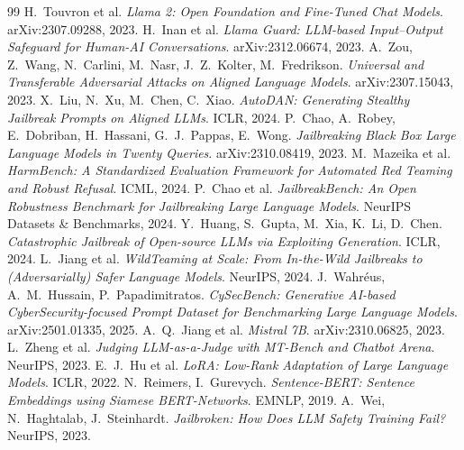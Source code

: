 \documentclass[11pt]{article}
\begin{document}

\begin{thebibliography}{99}
\small
{} H.\ Touvron et al. \emph{Llama 2: Open Foundation and Fine-Tuned Chat Models}. arXiv:2307.09288, 2023.
 H.\ Inan et al. \emph{Llama Guard: LLM-based Input--Output Safeguard for Human-AI Conversations}. arXiv:2312.06674, 2023.
 A.\ Zou, Z.\ Wang, N.\ Carlini, M.\ Nasr, J.\ Z.\ Kolter, M.\ Fredrikson. \emph{Universal and Transferable Adversarial Attacks on Aligned Language Models}. arXiv:2307.15043, 2023.
 X.\ Liu, N.\ Xu, M.\ Chen, C.\ Xiao. \emph{AutoDAN: Generating Stealthy Jailbreak Prompts on Aligned LLMs}. ICLR, 2024.
 P.\ Chao, A.\ Robey, E.\ Dobriban, H.\ Hassani, G.\ J.\ Pappas, E.\ Wong. \emph{Jailbreaking Black Box Large Language Models in Twenty Queries}. arXiv:2310.08419, 2023.
 M.\ Mazeika et al. \emph{HarmBench: A Standardized Evaluation Framework for Automated Red Teaming and Robust Refusal}. ICML, 2024.
 P.\ Chao et al. \emph{JailbreakBench: An Open Robustness Benchmark for Jailbreaking Large Language Models}. NeurIPS Datasets \& Benchmarks, 2024.
 Y.\ Huang, S.\ Gupta, M.\ Xia, K.\ Li, D.\ Chen. \emph{Catastrophic Jailbreak of Open-source LLMs via Exploiting Generation}. ICLR, 2024.
 L.\ Jiang et al. \emph{WildTeaming at Scale: From In-the-Wild Jailbreaks to (Adversarially) Safer Language Models}. NeurIPS, 2024.
 J.\ Wahr\'eus, A.\ M.\ Hussain, P.\ Papadimitratos. \emph{CySecBench: Generative AI-based CyberSecurity-focused Prompt Dataset for Benchmarking Large Language Models}. arXiv:2501.01335, 2025.
 A.\ Q.\ Jiang et al. \emph{Mistral 7B}. arXiv:2310.06825, 2023.
 L.\ Zheng et al. \emph{Judging LLM-as-a-Judge with MT-Bench and Chatbot Arena}. NeurIPS, 2023.
 E.\ J.\ Hu et al. \emph{LoRA: Low-Rank Adaptation of Large Language Models}. ICLR, 2022.
 N.\ Reimers, I.\ Gurevych. \emph{Sentence-BERT: Sentence Embeddings using Siamese BERT-Networks}. EMNLP, 2019.
 A.\ Wei, N.\ Haghtalab, J.\ Steinhardt. \emph{Jailbroken: How Does LLM Safety Training Fail?} NeurIPS, 2023.
\end{thebibliography}

\appendix
\end{document}
